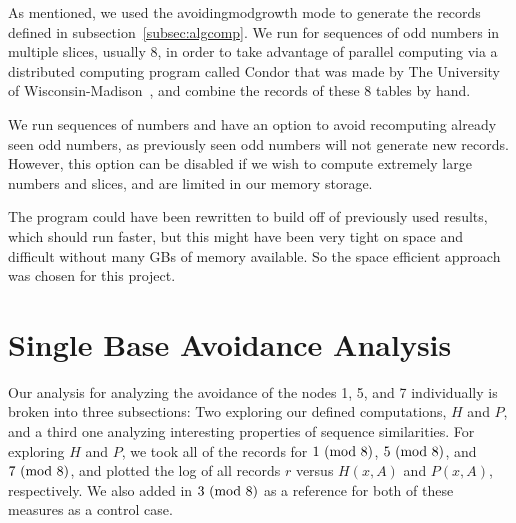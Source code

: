 As mentioned, we used the avoidingmodgrowth mode to generate the records defined in subsection~\ref{subsec:algcomp}. We run for sequences of odd numbers in multiple slices, usually 8, in order to take advantage of parallel computing via a distributed computing program called Condor that was made by The University of Wisconsin-Madison~\cite{Thain:2005:DCP:1064323.1064336}, and combine the records of these 8 tables by hand. \par
We run sequences of numbers and have an option to avoid recomputing already seen odd numbers, as previously seen odd numbers will not generate new records. However, this option can be disabled if we wish to compute extremely large numbers and slices, and are limited in our memory storage. \par
The program could have been rewritten to build off of previously used results, which should run faster, but this might have been very tight on space and difficult without many GBs of memory available. So the space efficient approach was chosen for this project.
\section{Single Base Avoidance Analysis} \label{subsec:algsinglebase}
Our analysis for analyzing the avoidance of the nodes 1, 5, and 7 individually is broken into three subsections: Two exploring our defined computations, $H$ and $P$, and a third one analyzing interesting properties of sequence similarities.
For exploring $H$ and $P$, we took all of the records for $1 \ (\mathrm{mod}\ 8)$, $5 \ (\mathrm{mod}\ 8)$, and $7 \ (\mathrm{mod}\ 8)$, and plotted the log of all records $r$ versus $H(x,A)$ and $P(x,A)$, respectively. We also added in $3 \ (\mathrm{mod}\ 8)$ as a reference for both of these measures as a control case.
